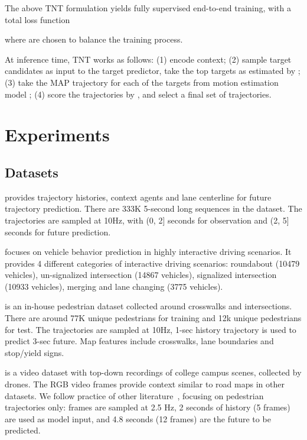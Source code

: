 \documentclass{article}
\newcommand{\model}{TNT\xspace}
\begin{document}
The above \model formulation yields fully supervised end-to-end training, with a total loss function

where  are chosen to balance the training process.

At inference time, \model works as follows: (1) encode context; (2) sample  target candidates as input to the target predictor, take the top  targets as estimated by ; (3) take the MAP trajectory for each of the  targets from motion estimation model ; (4) score the  trajectories by , and select a final set of  trajectories.

%
 \section{Experiments}

\subsection{Datasets}
 provides trajectory histories, context agents and lane centerline for future trajectory prediction. There are 333K 5-second long sequences in the dataset. The trajectories are sampled at 10Hz, with (0, 2] seconds for observation and (2, 5] seconds for future prediction. 

 focuses on vehicle behavior prediction in highly interactive driving scenarios. It provides 4 different categories of interactive driving scenarios: roundabout (10479 vehicles), un-signalized intersection (14867 vehicles), signalized intersection (10933 vehicles), merging and lane changing (3775 vehicles).

 is an in-house pedestrian dataset collected around crosswalks and intersections. There are around 77K unique pedestrians for training and 12k unique pedestrians for test. The trajectories are sampled at 10Hz, 1-sec history trajectory is used to predict 3-sec future. Map features include crosswalks, lane boundaries and stop/yield signs.

 is a video dataset with top-down recordings of college campus scenes, collected by drones.
The RGB video frames provide context similar to road maps in other datasets. We follow practice of other literature~\cite{SocialGAN,SocialLSTM,sadeghian2019sophie}, focusing on pedestrian trajectories only: frames are sampled at 2.5 Hz, 2 seconds of history (5 frames) are used as model input, and 4.8 seconds (12 frames) are the future to be predicted.
\end{document}
